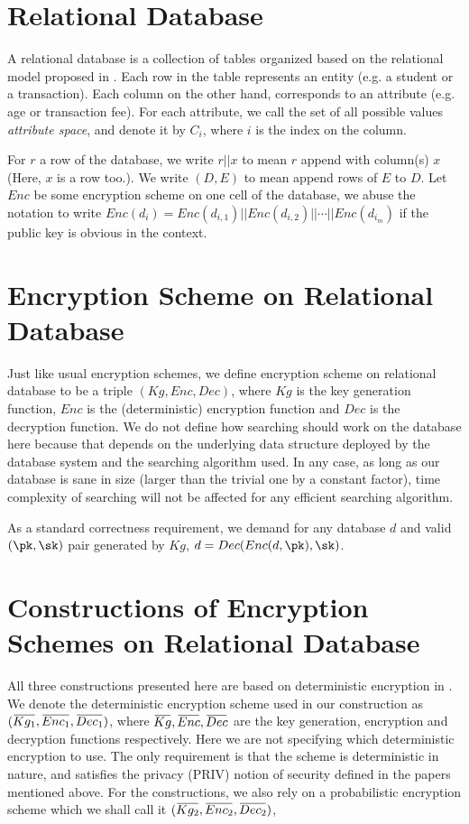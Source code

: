 \documentclass[10pt]{book}
\newcommand{\overbar}[1]{\mkern 1.5mu\overline{\mkern-1.5mu#1\mkern-1.5mu}\mkern 1.5mu}
\begin{document}
\section{Relational Database}
A relational database is a collection of tables organized based on the relational model proposed in \cite{Codd:1970:RMD:362384.362685}. Each row in the table represents an entity (e.g. a student or a transaction). Each column on the other hand, corresponds to an attribute (e.g. age or transaction fee). For each attribute, we call the set of all possible values \textit{attribute space}, and denote it by $C_i$, where $i$ is the index on the column.

For $r$ a row of the database, we write $r || x$ to mean $r$ append with column(s) $x$ (Here, $x$ is a row too.). We write $(D, E)$ to mean append rows of $E$ to $D$. Let $Enc$ be some encryption scheme on one cell of the database, we abuse the notation to write $Enc(d_i) = Enc(d_{i,1}) || Enc(d_{i,2}) || \cdots || Enc(d_{i_m})$ if the public key \pk is obvious in the context.




\section{Encryption Scheme on Relational Database}
Just like usual encryption schemes, we define encryption scheme on relational database to be a triple $(Kg, Enc, Dec)$, where $Kg$ is the key generation function, $Enc$ is the (deterministic) encryption function and $Dec$ is the decryption function. We do not define how searching should work on the database here because that depends on the underlying data structure deployed by the database system and the searching algorithm used. In any case, as long as our database is sane in size (larger than the trivial one by a constant factor), time complexity of searching will not be affected for any efficient searching algorithm.

As a standard correctness requirement, we demand for any database $d$ and valid $(\pk, \sk)$ pair generated by $Kg$, $d = Dec(Enc(d, \pk), \sk)$.





\section{Constructions of Encryption Schemes on Relational Database}
All three constructions presented here are based on deterministic encryption in \cite{Bellare2007, Bellare2008, Boldyreva2008}. We denote the deterministic encryption scheme used in our construction as $(\overbar{Kg_1}, \overbar{Enc_1}, \overbar{Dec_1})$, where $\overbar{Kg}, \overbar{Enc}, \overbar{Dec}$ are the key generation, encryption and decryption functions respectively. Here we are not specifying which deterministic encryption to use. The only requirement is that the scheme is deterministic in nature, and satisfies the privacy (PRIV) notion of security defined in the papers mentioned above. For the constructions, we also rely on a probabilistic encryption scheme which we shall call it $(\overbar{Kg_2}, \overbar{Enc_2}, \overbar{Dec_2})$,
\end{document}
